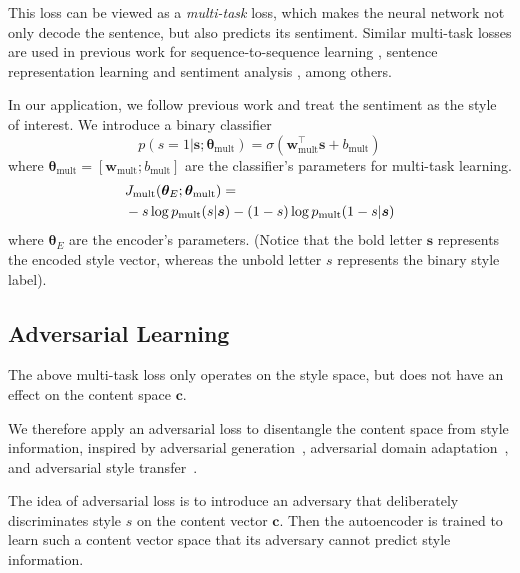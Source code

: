 \documentclass[11pt,a4paper]{article}
\begin{document}
This loss can be viewed as a \textit{multi-task} loss, which makes the neural network not only decode the sentence, but also predicts its sentiment. Similar multi-task losses are used in previous work for sequence-to-sequence learning \cite{luong2015multi}, sentence representation learning \cite{jernite2017discourse} and sentiment analysis \cite{balikas2017multitask}, among others.

In our application, we follow previous work \cite{hu2017toward,shen2017style,fu2017style} and treat the sentiment as the style of interest. We introduce a binary classifier
\begin{equation}
	p(s=1|\bm s;\bm\theta_\text{mult})=\sigma(\bm w_\text{mult}^\top \bm s + b_\text{mult})
\end{equation}
where $\bm\theta_\text{mult}=[\bm w_\text{mult}; b_\text{mult}]$ are the classifier's parameters for multi-task learning.
\vspace{-.3cm}
\begin{align} \label{eqn:Jmult}
	 & J_\text{mult}(\bm\theta_{E};\bm\theta_\text{mult})=                \\ \nonumber
	 & -s\log p_\text{mult}(s|\bm s) - (1-s)\log p_\text{mult}(1-s|\bm s)
	\vspace{-.3cm}
\end{align}
where $\bm\theta_E$ are the encoder's parameters. (Notice that the bold letter $\bm s$ represents the encoded style vector, whereas the unbold letter $s$ represents the binary style label).


\subsection{Adversarial Learning} \label{ss:adv}

The above multi-task loss only operates on the style space, but does not have an effect on the content space $\bm c$.

We therefore apply an adversarial loss to disentangle the content space from style information, inspired by adversarial generation~\cite{goodfellow2014generative}, adversarial domain adaptation~\cite{liu2017adversarial}, and adversarial style transfer~\cite{fu2017style}.

The idea of adversarial loss is to introduce an adversary that deliberately discriminates style $s$ on the content vector $\bm c$. Then the autoencoder is trained to learn such a content vector space that its adversary cannot predict style information.
\end{document}
